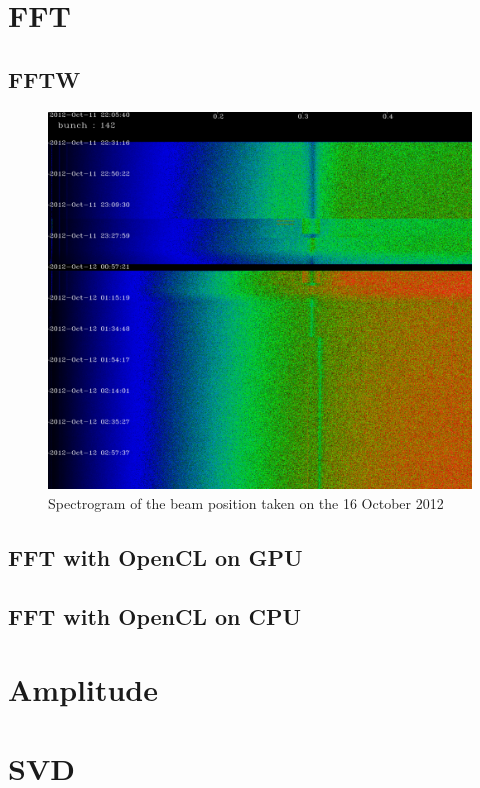 \section{FFT}

   \subsection{FFTW}

\begin{figure}
\caption{Spectrogram of the beam position taken on the 16 October 2012}
\centering
\includegraphics[scale=0.2]{spectrogram.pdf}
\end{figure}

   \subsection{FFT with OpenCL on GPU}

   \subsection{FFT with OpenCL on CPU}

\section{Amplitude}

\section{SVD}


